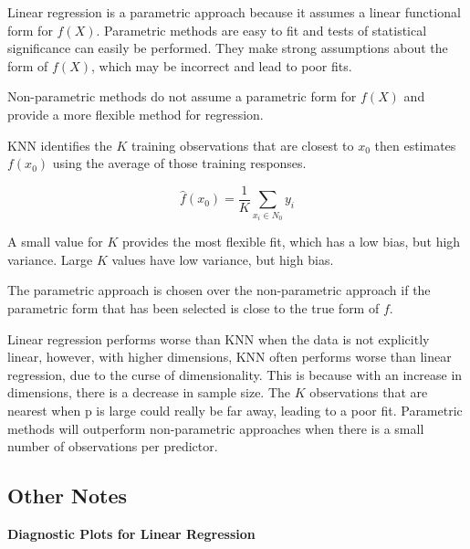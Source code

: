 \documentclass[
]{article}
\begin{document}
Linear regression is a parametric approach because it assumes a linear
functional form for \(f(X)\). Parametric methods are easy to fit and
tests of statistical significance can easily be performed. They make
strong assumptions about the form of \(f(X)\), which may be incorrect
and lead to poor fits.

Non-parametric methods do not assume a parametric form for \(f(X)\) and
provide a more flexible method for regression.

KNN identifies the \(K\) training observations that are closest to
\(x_0\) then estimates \(f(x_0)\) using the average of those training
responses.

\[\hat{f}(x_0) = \frac{1}{K}\sum_{x_i\in N_0}y_i\]

A small value for \(K\) provides the most flexible fit, which has a low
bias, but high variance. Large \(K\) values have low variance, but high
bias.

The parametric approach is chosen over the non-parametric approach if
the parametric form that has been selected is close to the true form of
\(f\).

Linear regression performs worse than KNN when the data is not
explicitly linear, however, with higher dimensions, KNN often performs
worse than linear regression, due to the curse of dimensionality. This
is because with an increase in dimensions, there is a decrease in sample
size. The \(K\) observations that are nearest when p is large could
really be far away, leading to a poor fit. Parametric methods will
outperform non-parametric approaches when there is a small number of
observations per predictor.

\hypertarget{header-n139}{%
\subsection{Other Notes}\label{header-n139}}

\textbf{Diagnostic Plots for Linear Regression}
\end{document}
